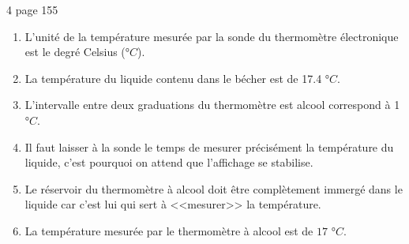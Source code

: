 \begin{myact}{4 page 155}
	\begin{enumerate}
		\item L'unité de la température mesurée par la sonde du thermomètre électronique est le degré Celsius (°$C$). \pause
		\item La température du liquide contenu dans le bécher est de \num{17.4} °$C$.\pause
		\item L'intervalle entre deux graduations du thermomètre est alcool correspond à 1 °$C$.\pause
		\item Il faut laisser à la sonde le temps de mesurer précisément la température du liquide, c'est pourquoi on attend que l'affichage se stabilise.\pause
		\item Le réservoir du thermomètre à alcool doit être complètement immergé dans le liquide car c'est lui qui sert à <<mesurer>> la température.\pause
		\item La température mesurée par le thermomètre à alcool est de $17$ °$C$.		
	\end{enumerate}
\end{myact}